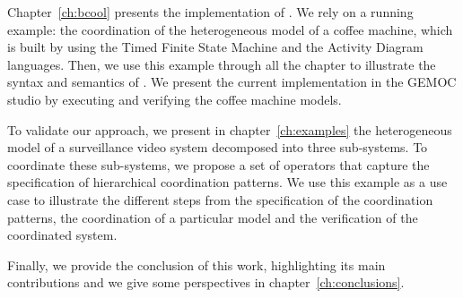 Chapter~\ref{ch:bcool} presents the implementation of \bcool. We rely on a running example: the coordination of the heterogeneous model of a coffee machine, which is built by using the Timed Finite State Machine and the Activity Diagram languages. Then, we use this example through all the chapter to illustrate the syntax and semantics of \bcool. We present the current implementation in the GEMOC studio by executing and verifying the coffee machine models. 

To validate our approach, we present in chapter~\ref{ch:examples} the heterogeneous model of a surveillance video system decomposed into three sub-systems. To coordinate these sub-systems, we propose a set of \bcool operators that capture the specification of hierarchical coordination patterns. We use this example as a use case to illustrate the different steps from the specification of the coordination patterns, the coordination of a particular model and the verification of the coordinated system.     

Finally, we provide the conclusion of this work, highlighting its main contributions and we give some perspectives in chapter~\ref{ch:conclusions}.

	
	







